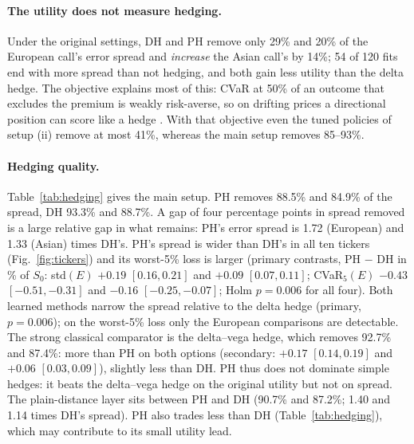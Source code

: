 \documentclass[runningheads]{llncs}
\begin{document}
\paragraph{The utility does not measure hedging.} Under the original settings, DH and PH remove only 29\%
and 20\% of the European call's error spread and \emph{increase} the Asian call's by 14\%; 54 of 120 fits
end with more spread than not hedging, and both gain less utility than the delta hedge. The objective
explains most of this: CVaR at 50\% of an outcome that excludes the premium is weakly risk-averse, so on
drifting prices a directional position can score like a hedge \cite{buehler2021drift}. With that objective
even the tuned policies of setup (ii) remove at most 41\%, whereas the main setup removes 85--93\%.

\begin{table}[t]
\caption{Hedging quality in the main setup, test 2022--2024. Removed: reduction in std$(E)$ relative to
not hedging. Std $E$, worst-5\% loss CVaR$_5(E)$ (closer to zero is better) and mean trading cost in \% of
$S_0$. The rows above the line are rule-based hedges.}
\label{tab:hedging}
\centering
\scriptsize
\setlength{\tabcolsep}{3.4pt}

\end{table}

\paragraph{Hedging quality.} Table~\ref{tab:hedging} gives the main setup. PH removes 88.5\% and 84.9\% of
the spread, DH 93.3\% and 88.7\%. A gap of four percentage points in spread removed is a large relative
gap in what remains: PH's error spread is 1.72 (European) and 1.33 (Asian) times DH's. PH's spread is
wider than DH's in all ten tickers (Fig.~\ref{fig:tickers}) and its worst-5\% loss is larger (primary
contrasts, PH $-$ DH in \% of $S_0$: std$(E)$ $+0.19$ $[0.16,0.21]$ and $+0.09$ $[0.07,0.11]$;
CVaR$_5(E)$ $-0.43$ $[-0.51,-0.31]$ and $-0.16$ $[-0.25,-0.07]$; Holm $p=0.006$ for all four). Both learned
methods narrow the spread relative to the delta hedge (primary, $p=0.006$); on the worst-5\% loss only
the European comparisons are detectable. The strong classical comparator is the delta--vega hedge, which
removes 92.7\% and 87.4\%: more than PH on both options (secondary: $+0.17$ $[0.14,0.19]$ and $+0.06$
$[0.03,0.09]$), slightly less than DH. PH thus does not dominate simple hedges: it beats the delta--vega
hedge on the original utility but not on spread. The plain-distance layer sits between PH and DH (90.7\%
and 87.2\%; 1.40 and 1.14 times DH's spread). PH also trades less than DH (Table~\ref{tab:hedging}), which may contribute to its small utility lead.
\end{document}
